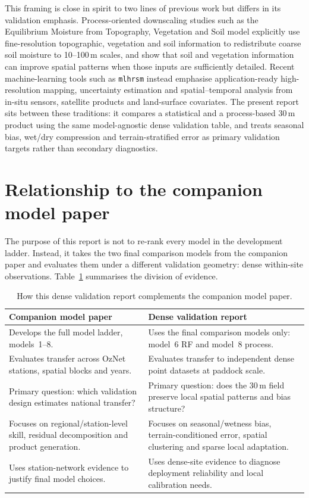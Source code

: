 \documentclass[11pt,a4paper]{article}
\newcommand{\modelSix}{model~6 RF}
\newcommand{\modelEight}{model~8 process}
\begin{document}
This framing is close in spirit to two lines of previous work but differs in
its validation emphasis.  Process-oriented downscaling studies such as the
Equilibrium Moisture from Topography, Vegetation and Soil model
\citep[EMT+VS;][]{ranney2015emtvs} explicitly use fine-resolution topographic,
vegetation and soil information to redistribute coarse soil moisture to
10--100\,m scales, and show that soil and vegetation information can improve
spatial patterns when those inputs are sufficiently detailed.  Recent
machine-learning tools such as \texttt{mlhrsm} \citep{peng2024mlhrsm} instead
emphasise application-ready high-resolution mapping, uncertainty estimation and
spatial--temporal analysis from in-situ sensors, satellite products and
land-surface covariates.  The present report sits between these traditions: it
compares a statistical and a process-based 30\,m product using the same
model-agnostic dense validation table, and treats seasonal bias, wet/dry
compression and terrain-stratified error as primary validation targets rather
than secondary diagnostics.

\section{Relationship to the companion model paper}\label{sec:sister}

The purpose of this report is not to re-rank every model in the development
ladder.  Instead, it takes the two final comparison models from the companion
paper and evaluates them under a different validation geometry: dense
within-site observations.  Table~\ref{tab:sister} summarises the division of
evidence.

\begin{table}[htbp]
\centering
\caption{How this dense validation report complements the companion model
paper.}
\label{tab:sister}
\begin{tabularx}{\textwidth}{>{\raggedright\arraybackslash}X
                              >{\raggedright\arraybackslash}X}
\toprule
\textbf{Companion model paper} & \textbf{Dense validation report} \\
\midrule
Develops the full model ladder, models~1--8. &
Uses the final comparison models only: \modelSix{} and \modelEight{}. \\
Evaluates transfer across OzNet stations, spatial blocks and years. &
Evaluates transfer to independent dense point datasets at paddock scale. \\
Primary question: which validation design estimates national transfer? &
Primary question: does the 30\,m field preserve local spatial patterns and
bias structure? \\
Focuses on regional/station-level skill, residual decomposition and product
generation. &
Focuses on seasonal/wetness bias, terrain-conditioned error, spatial clustering
and sparse local adaptation. \\
Uses station-network evidence to justify final model choices. &
Uses dense-site evidence to diagnose deployment reliability and local
calibration needs. \\
\bottomrule
\end{tabularx}
\end{table}
\end{document}

